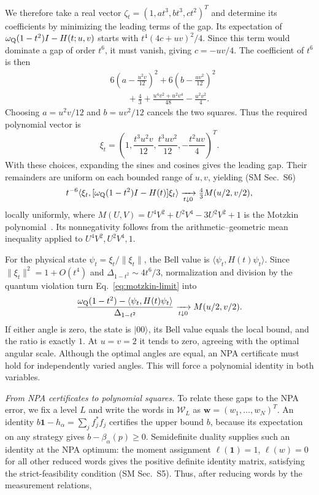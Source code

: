 \documentclass[aps,prl,twocolumn,10pt,superscriptaddress,nofootinbib,longbibliography,nobalancelastpage]{revtex4-2}
\newcommand{\id}{\mathbf 1}
\begin{document}
We therefore take a real vector $\zeta_t=(1,at^3,bt^3,ct^2)^T$ and determine its coefficients by minimizing the leading terms of the gap. Its expectation of $\omega_{\rm Q}(1-t^2)I-H(t;u,v)$ starts with $t^4(4c+uv)^2/4$. Since this term would dominate a gap of order $t^6$, it must vanish, giving $c=-uv/4$. The coefficient of $t^6$ is then
\begin{align}
&6\left(a-\frac{u^2v}{12}\right)^2+6\left(b-\frac{uv^2}{12}\right)^2\nonumber\\
&\qquad+\frac43+\frac{u^4v^2+u^2v^4}{48}-\frac{u^2v^2}{4}.
\label{eq:completion}
\end{align}
Choosing $a=u^2v/12$ and $b=uv^2/12$ cancels the two squares. Thus the required polynomial vector is
\begin{equation}
\xi_t=\left(1,\frac{t^3u^2v}{12},\frac{t^3uv^2}{12},-\frac{t^2uv}{4}\right)^T.
\label{eq:xi}
\end{equation}
With these choices, expanding the sines and cosines gives the leading gap. Their remainders are uniform on each bounded range of $u,v$, yielding (SM Sec.~S6)
\begin{equation}
t^{-6}\langle\xi_t,[\omega_{\rm Q}(1-t^2)I-H(t)]\xi_t\rangle
\xrightarrow[t\downarrow0]{}\tfrac43M(u/2,v/2),
\label{eq:motzkin-limit}
\end{equation}
locally uniformly, where $M(U,V)=U^4V^2+U^2V^4-3U^2V^2+1$ is the Motzkin polynomial~\cite{Motzkin1967}. Its nonnegativity follows from the arithmetic--geometric mean inequality applied to $U^4V^2,U^2V^4,1$.

For the physical state $\psi_t=\xi_t/\|\xi_t\|$, the Bell value is $\langle\psi_t,H(t)\psi_t\rangle$. Since $\|\xi_t\|^2=1+O(t^4)$ and $\Delta_{1-t^2}\sim4t^6/3$, normalization and division by the quantum violation turn Eq.~\eqref{eq:motzkin-limit} into
\begin{equation}
\frac{\omega_{\rm Q}(1-t^2)-\langle\psi_t,H(t)\psi_t\rangle}
{\Delta_{1-t^2}}
\xrightarrow[t\downarrow0]{}M(u/2,v/2).
\label{eq:strategy-gap}
\end{equation}
If either angle is zero, the state is $|00\rangle$, its Bell value equals the local bound, and the ratio is exactly $1$. At $u=v=2$ it tends to zero, agreeing with the optimal angular scale. Although the optimal angles are equal, an NPA certificate must hold for independently varied angles. This will force a polynomial identity in both variables.

\emph{From NPA certificates to polynomial squares.} To relate these gaps to the NPA error, we fix a level $L$ and write the words in $\mathcal W_L$ as $\bm w=(w_1,\ldots,w_N)^T$. An identity $b\id-h_\alpha=\sum_j f_j^*f_j$ certifies the upper bound $b$, because its expectation on any strategy gives $b-\beta_\alpha(p)\geq0$. Semidefinite duality supplies such an identity at the NPA optimum: the moment assignment $\ell(\id)=1$, $\ell(w)=0$ for all other reduced words gives the positive definite identity matrix, satisfying the strict-feasibility condition (SM Sec.~S5). Thus, after reducing words by the measurement relations,
\end{document}
